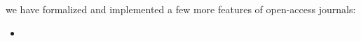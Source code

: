 \documentclass{jpcfinal} %
\begin{document}
we have formalized and implemented a few more features of open-access journals:
\begin{itemize}
	\item 
\end{itemize}

%
%
%		
%		
%		





%




\end{document}
